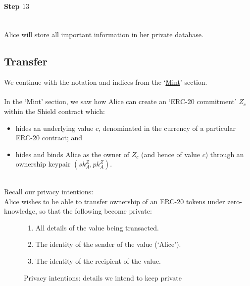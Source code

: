 \documentclass{article}
\begin{document}
\paragraph{Step $13$}
\ \\
Alice will store all important information in her private database.\\




















\newpage

\subsection{Transfer}
\label{sec:20Transfer}

We continue with the notation and indices from the `\hyperref[sec:Mint]{Mint}' section.\\
\\
In the `Mint' section, we saw how Alice can create an `ERC-20 commitment' $Z_c$ within the Shield contract which:
\begin{itemize}
  \item hides an underlying value $c$, denominated in the currency of a particular ERC-20 contract; and
  \item hides and binds Alice as the owner of $Z_c$ (and hence of value $c$) through an ownership keypair $(sk_A^Z, pk_A^Z)$.
\end{itemize}
\ \\
Recall our privacy intentions:\\
Alice wishes to be able to transfer ownership of an ERC-20 tokens under zero-knowledge, so that the following become private:

\begin{figure}[H]
	\begin{center}
		\begin{framed}
      \begin{enumerate}
        \item All details of the value being transacted.
        \item The identity of the sender of the value (`Alice').
        \item The identity of the recipient of the value.
      \end{enumerate}
    \end{framed}
  \end{center}
  \caption{Privacy intentions: details we intend to keep private}
\end{figure}
\end{document}
